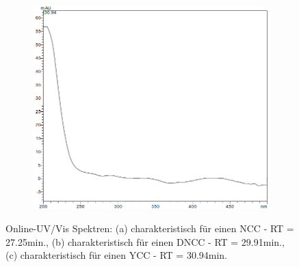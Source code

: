 \begin{figure}[!htbp]
  \begin{subfigure}[b]{0.5\textwidth}
    \includegraphics[width=\textwidth]{figures/Kapitel6/keineReaktion/YCC3094.png}
    \caption{}
    \label{fig:YCC3094}
  \end{subfigure}
  \caption[Online-UV/Vis Spektren mit der Charakteristik eines NCC bei 27.10min., eines DNCC bei 29.75min. sowie eines YCC bei 30.94min., Quelle: Autor]{Online-UV/Vis Spektren: (a) charakteristisch für einen \gls{NCC} - RT = 27.25min., (b) charakteristisch für einen \gls{DNCC} - RT = 29.91min., (c) charakteristisch für einen \gls{YCC} - RT = 30.94min.}
\end{figure}
